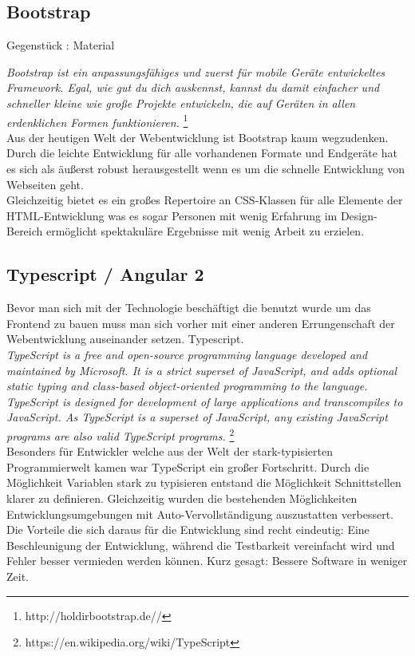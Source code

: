 \subsection{Bootstrap}

Gegenstück : Material

\emph{\glqq   
Bootstrap ist ein anpassungsfähiges und zuerst für mobile Geräte entwickeltes Framework. Egal, wie gut du dich auskennst, kannst du damit einfacher und schneller kleine wie große Projekte entwickeln, die auf Geräten in allen erdenklichen Formen funktionieren.
\grqq} \footnote{http://holdirbootstrap.de//} \\

Aus der heutigen Welt der Webentwicklung ist Bootstrap kaum wegzudenken. Durch die leichte Entwicklung für alle vorhandenen Formate und Endgeräte hat es sich als äußerst robust herausgestellt wenn es um die schnelle Entwicklung von Webseiten geht. \\
Gleichzeitig bietet es ein großes Repertoire an CSS-Klassen für alle Elemente der HTML-Entwicklung was es sogar Personen mit wenig Erfahrung im Design-Bereich ermöglicht spektakuläre Ergebnisse mit wenig Arbeit zu erzielen.



\subsection{Typescript / Angular 2}

Bevor man sich mit der Technologie beschäftigt die benutzt wurde um das Frontend zu bauen muss man sich vorher mit einer anderen Errungenschaft der Webentwicklung auseinander setzen. Typescript. \\

\emph{\glqq   
TypeScript is a free and open-source programming language developed and maintained by Microsoft. It is a strict superset of JavaScript, and adds optional static typing and class-based object-oriented programming to the language. \\
TypeScript is designed for development of large applications and transcompiles to JavaScript. As TypeScript is a superset of JavaScript, any existing JavaScript programs are also valid TypeScript programs.
\grqq} \footnote{https://en.wikipedia.org/wiki/TypeScript} \\

Besonders für Entwickler welche aus der Welt der stark-typisierten Programmierwelt kamen war TypeScript ein großer Fortschritt. Durch die Möglichkeit Variablen stark zu typisieren entstand die Möglichkeit Schnittstellen klarer zu definieren. Gleichzeitig wurden die bestehenden Möglichkeiten Entwicklungsumgebungen mit Auto-Vervollständigung auszustatten verbessert. \\
Die Vorteile die sich daraus für die Entwicklung sind recht eindeutig: Eine Beschleunigung der Entwicklung, während die Testbarkeit vereinfacht wird und Fehler besser vermieden werden können. Kurz gesagt: Bessere Software in weniger Zeit.

